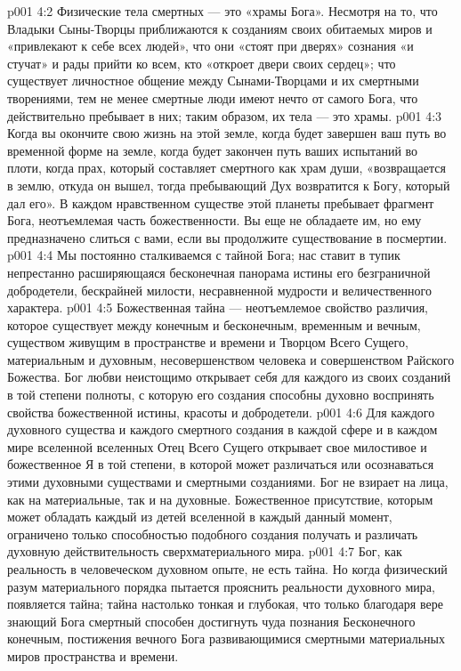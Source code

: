 \vs p001 4:2 Физические тела смертных --- это «храмы Бога». Несмотря на то, что Владыки Сыны\hyp{}Творцы приближаются к созданиям своих обитаемых миров и «привлекают к себе всех людей», что они «стоят при дверях» сознания «и стучат» и рады прийти ко всем, кто «откроет двери своих сердец»; что существует личностное общение между Сынами\hyp{}Творцами и их смертными творениями, тем не менее смертные люди имеют нечто от самого Бога, что действительно пребывает в них; таким образом, их тела --- это храмы.
\vs p001 4:3 Когда вы окончите свою жизнь на этой земле, когда будет завершен ваш путь во временной форме на земле, когда будет закончен путь ваших испытаний во плоти, когда прах, который составляет смертного как храм души, «возвращается в землю, откуда он вышел, тогда пребывающий Дух возвратится к Богу, который дал его». В каждом нравственном существе этой планеты пребывает фрагмент Бога, неотъемлемая часть божественности. Вы еще не обладаете им, но ему предназначено слиться с вами, если вы продолжите существование в посмертии.
\vs p001 4:4 \pc Мы постоянно сталкиваемся с тайной Бога; нас ставит в тупик непрестанно расширяющаяся бесконечная панорама истины его безграничной добродетели, бескрайней милости, несравненной мудрости и величественного характера.
\vs p001 4:5 \pc Божественная тайна --- неотъемлемое свойство различия, которое существует между конечным и бесконечным, временным и вечным, существом живущим в пространстве и времени и Творцом Всего Сущего, материальным и духовным, несовершенством человека и совершенством Райского Божества. Бог любви неистощимо открывает себя для каждого из своих созданий в той степени полноты, с которую его создания способны духовно воспринять свойства божественной истины, красоты и добродетели.
\vs p001 4:6 Для каждого духовного существа и каждого смертного создания в каждой сфере и в каждом мире вселенной вселенных Отец Всего Сущего открывает свое милостивое и божественное Я в той степени, в которой может различаться или осознаваться этими духовными существами и смертными созданиями. Бог не взирает на лица, как на материальные, так и на духовные. Божественное присутствие, которым может обладать каждый из детей вселенной в каждый данный момент, ограничено только способностью подобного создания получать и различать духовную действительность сверхматериального мира.
\vs p001 4:7 Бог, как реальность в человеческом духовном опыте, не есть тайна. Но когда физический разум материального порядка пытается прояснить реальности духовного мира, появляется тайна; тайна настолько тонкая и глубокая, что только благодаря вере знающий Бога смертный способен достигнуть чуда познания Бесконечного конечным, постижения вечного Бога развивающимися смертными материальных миров пространства и времени.
